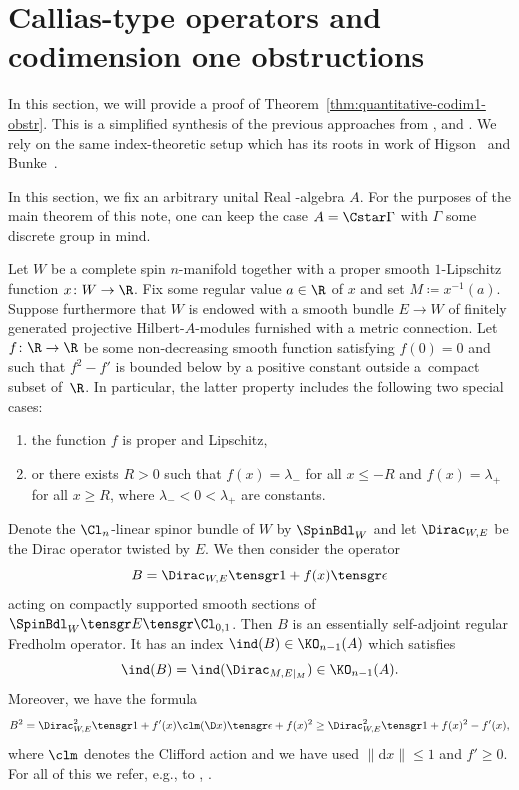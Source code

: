 \section{Callias-type operators and codimension one obstructions} \label{sec:codim-1-obstr}
In this section, we will provide a proof of Theorem~\ref{thm:quantitative-codim1-obstr}.
This is a simplified synthesis of the previous approaches from \cite{Cecchini:CalliasTypePSC}, \cite[Section~6]{Cecchini:LongNeck} and \cite[Section~2]{Zeidler:band-width-estimates}.
We rely on the same index-theoretic setup which has its roots in work of Higson~\cite{Higson:CobordismInvariance} and Bunke~\cite{Bunke:RelativeIndexCallias}.

In this section, we fix an arbitrary unital Real \textCstar-algebra \(A\).
For the purposes of the main theorem of this note, one can keep the case \(A = \Cstar \Gamma\) with \(\Gamma\) some discrete group in mind.

Let \(W\) be a complete spin \(n\)-manifold together with a proper smooth \(1\)-Lipschitz function \(x \colon W \to \R\).
Fix some regular value \(a \in \R\) of \(x\) and set \(M \coloneqq x^{-1}(a)\).
Suppose furthermore that \(W\) is endowed with a smooth bundle \(E \to W\) of finitely generated projective Hilbert-\(A\)-modules furnished with a metric connection.
Let \(f \colon \R \to \R\) be some non-decreasing smooth function satisfying \(f(0) = 0\) and such that \(f^2 - f'\) is bounded below by a positive constant outside a~compact subset of~\(\R\).
In particular, the latter property includes the following two special cases:
\begin{enumerate}\itemsep=0pt
 \item[(i)] the function \(f\) is proper and Lipschitz,
 \item[(ii)] or there exists \(R > 0\) such that \(f(x) = \lambda_-\) for all \(x \leq -R\) and \(f(x) = \lambda_+\) for all \(x \geq R\), where \(\lambda_- < 0 < \lambda_+\) are constants.
\end{enumerate}
Denote the \(\Cl_n\)-linear spinor bundle of \(W\) by \(\SpinBdl_W\) and let \(\Dirac_{W,E}\) be the Dirac operator twisted by \(E\).
We then consider the operator
\[
 B = \Dirac_{W, E} \tensgr 1 + f(x) \tensgr \epsilon
\]
acting on compactly supported smooth sections of \(\SpinBdl_W \tensgr E \tensgr \Cl_{0,1}\).
Then \(B\) is an essentially self-adjoint regular Fredholm operator.
It has an index \(\ind(B) \in \KO_{n-1}(A)\) which satisfies
\[
 \ind(B) = \ind(\Dirac_{M, E|_M}) \in \KO_{n-1}(A).
\]
Moreover, we have the formula
\begin{equation}
B^2 = \Dirac^2_{W,E} \tensgr 1 + f'(x) \clm(\D x) \tensgr \epsilon + f(x)^2 \geq \Dirac^2_{W,E} \tensgr 1 + f(x)^2 - f'(x),
\label{eq:callias-estimate}
\end{equation}
where \(\clm\) denotes the Clifford action and we have used \(\|\mathrm{d} x\| \leq 1\) and \(f' \geq 0\).
For all of this we refer, e.g., to \cite[Section~6]{Cecchini:LongNeck}, \cite[Appendix~A]{Zeidler:band-width-estimates}.

